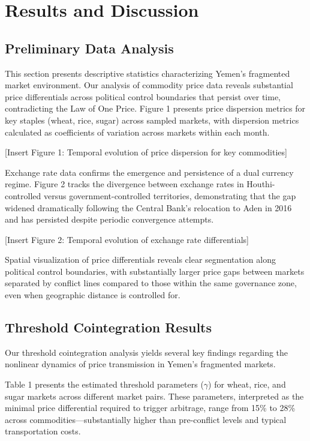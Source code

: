 \section{Results and Discussion}

\subsection{Preliminary Data Analysis}

This section presents descriptive statistics characterizing Yemen's fragmented market environment. Our analysis of commodity price data reveals substantial price differentials across political control boundaries that persist over time, contradicting the Law of One Price. Figure 1 presents price dispersion metrics for key staples (wheat, rice, sugar) across sampled markets, with dispersion metrics calculated as coefficients of variation across markets within each month.

[Insert Figure 1: Temporal evolution of price dispersion for key commodities]

Exchange rate data confirms the emergence and persistence of a dual currency regime. Figure 2 tracks the divergence between exchange rates in Houthi-controlled versus government-controlled territories, demonstrating that the gap widened dramatically following the Central Bank's relocation to Aden in 2016 and has persisted despite periodic convergence attempts.

[Insert Figure 2: Temporal evolution of exchange rate differentials]

Spatial visualization of price differentials reveals clear segmentation along political control boundaries, with substantially larger price gaps between markets separated by conflict lines compared to those within the same governance zone, even when geographic distance is controlled for.

\subsection{Threshold Cointegration Results}

Our threshold cointegration analysis yields several key findings regarding the nonlinear dynamics of price transmission in Yemen's fragmented markets.

Table 1 presents the estimated threshold parameters ($\gamma$) for wheat, rice, and sugar markets across different market pairs. These parameters, interpreted as the minimal price differential required to trigger arbitrage, range from 15\% to 28\% across commodities—substantially higher than pre-conflict levels and typical transportation costs.

